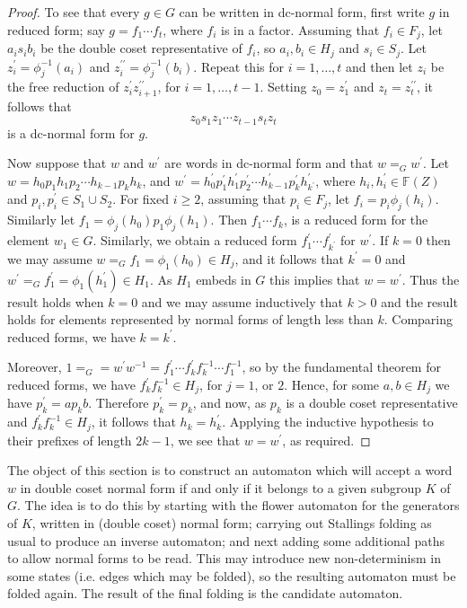 \documentclass[a4paper,12pt]{article}
\numberwithin{equation}{section}
\numberwithin{figure}{section}
\newcommand{\FF}{\ensuremath{\mathbb{F}}}
\begin{document}
\begin{proof}
To see that every $g\in G$ can be written in dc-normal form, first
write $g$ in reduced form; say $g=f_1\cdots f_t$, where $f_i$ is in a
factor. Assuming that $f_i\in F_j$, let $a_is_ib_i$
be the double coset representative of $f_i$, so
$a_i,b_i\in H_j$ and $s_i\in S_j$. Let $z^{\prime}_i=\phi_j^{-1}(a_i)$ and
$z^{\prime\prime}_i=\phi_j^{-1}(b_i)$. Repeat this for $i=1,\ldots ,t$ and then
let $z_i$ be the free reduction of $z^{\prime}_iz^{\prime\prime}_{i+1}$,
for $i=1,\ldots ,t-1$. Setting $z_0=z^{\prime}_1$ and $z_t=
z^{\prime\prime}_t$, it follows that
\[z_0s_1z_1\cdots z_{t-1}s_tz_t\]
is a dc-normal form for $g$.

Now suppose that $w$ and $w^\prime$ are words in dc-normal form and that
$w=_G w^\prime$. Let $w=h_{0}p_1h_{1}p_2 \cdots h_{k-1}p_kh_{{k}}$,
and $w^\prime =h_{0}^\prime p_1^\prime h_{1}^\prime  p_2^\prime
\cdots h_{k-1}^\prime p_k^\prime h_{{k^\prime}}^\prime$, where
$h_i, h_i^\prime\in \FF(Z)$ and $p_i,p_i^\prime\in S_1\cup S_2$.
 For fixed $i\ge 2$, assuming that $p_i\in F_j$, let $f_i=p_i\phi_j(h_i)$.
Similarly let $f_1=\phi_j(h_0)p_1\phi_j(h_1)$. Then $f_1\cdots f_k$, is
a reduced form for the element $w_1\in G$. Similarly, we obtain a reduced
form $f_1^\prime \cdots f_{k^\prime}^\prime$ for $w^\prime$.
If $k=0$ then we may assume $w=_G f_1=\phi_1(h_0)\in H_j$,
and it follows that $k^\prime =0$ and $w^\prime=_G f_1^\prime=\phi_1(h_1^\prime)\in H_1$.
As $H_1$ embeds in $G$ this implies that $w=w^\prime$. Thus the result
holds when $k=0$ and we may assume inductively that $k>0$ and the result holds
for elements represented by normal forms of length less than $k$.
Comparing reduced forms, we have $k=k^\prime$.

Moreover, $1=_G =w^\prime w^{-1}= f_1^\prime \cdots f_{k}^\prime
f_k^{-1}\cdots f_1^{-1}$, so by the fundamental theorem for reduced forms,
we have $ f_{k}^\prime f_k^{-1}\in H_j$, for $j=1$, or $2$. Hence, for
some $a, b\in H_j$ we have $p_k^\prime=a p_k b$. Therefore $p_k^\prime =p_k$,
and now, as $p_k$ is a double coset representative and  $ f_{k}^\prime f_k^{-1}\in H_j$,
it follows that $h_k=h_k^\prime$. Applying the inductive hypothesis to their prefixes of
length
$2k-1$, we see that $w=w^\prime$, as required.
\end{proof}
The object of this section is to construct an automaton which will accept a word
$w$ in double coset normal form if and only if it belongs to a
given subgroup $K$ of $G$. The idea is to do this by starting with the
flower automaton for the generators of $K$, written in (double
coset) normal form; carrying out Stallings folding as usual to
produce an inverse automaton; and next
adding some additional paths to allow normal forms to be read.
This may introduce new non-determinism in some  states (i.e. edges
which may be folded), so the resulting automaton must be folded
again. The result of the final folding is the candidate automaton.
\end{document}
